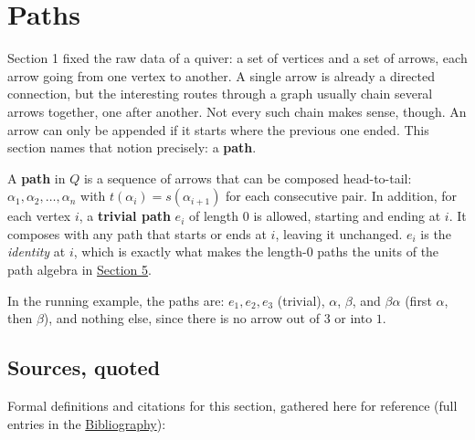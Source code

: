 \section{Paths}\label{sec:11-path-algebras:02-paths:1}

Section 1 fixed the raw data of a quiver: a set of vertices and a set of arrows, each arrow going from one vertex to another. A single arrow is already a directed connection, but the interesting routes through a graph usually chain several arrows together, one after another. Not every such chain makes sense, though. An arrow can only be appended if it starts where the previous one ended. This section names that notion precisely: a \textbf{path}.

A \textbf{path} in \(Q\) is a sequence of arrows that can be composed head-to-tail: \(\alpha_1, \alpha_2, \dots, \alpha_n\) with \(t(\alpha_i) = s(\alpha_{i+1})\) for each consecutive pair. In addition, for each vertex \(i\), a \textbf{trivial path} \(e_i\) of length \(0\) is allowed, starting and ending at \(i\). It composes with any path that starts or ends at \(i\), leaving it unchanged. \(e_i\) is the \emph{identity} at \(i\), which is exactly what makes the length-\(0\) paths the units of the path algebra in \hyperref[sec:11-path-algebras:05-path-composition:1]{Section 5}.

In the running example, the paths are: \(e_1, e_2, e_3\) (trivial), \(\alpha\), \(\beta\), and \(\beta\alpha\) (first \(\alpha\), then \(\beta\)), and nothing else, since there is no arrow out of \(3\) or into \(1\).

\subsection{Sources, quoted}\label{sec:11-path-algebras:02-paths:2}

Formal definitions and citations for this section, gathered here for reference (full entries in the \hyperref[sec:root:bibliography:1]{Bibliography}):

